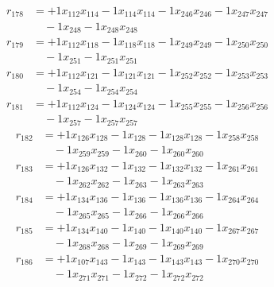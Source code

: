 \[\begin{aligned}
r_{178} &= + 1 x_{112} x_{114} - 1 x_{114} x_{114} - 1 x_{246} x_{246} - 1 x_{247} x_{247} \\
 &\quad - 1 x_{248} - 1 x_{248} x_{248}
\end{aligned}\]
\[\begin{aligned}
r_{179} &= + 1 x_{112} x_{118} - 1 x_{118} x_{118} - 1 x_{249} x_{249} - 1 x_{250} x_{250} \\
 &\quad - 1 x_{251} - 1 x_{251} x_{251}
\end{aligned}\]
\[\begin{aligned}
r_{180} &= + 1 x_{112} x_{121} - 1 x_{121} x_{121} - 1 x_{252} x_{252} - 1 x_{253} x_{253} \\
 &\quad - 1 x_{254} - 1 x_{254} x_{254}
\end{aligned}\]
\[\begin{aligned}
r_{181} &= + 1 x_{112} x_{124} - 1 x_{124} x_{124} - 1 x_{255} x_{255} - 1 x_{256} x_{256} \\
 &\quad - 1 x_{257} - 1 x_{257} x_{257}
\end{aligned}\]
\[\begin{aligned}
r_{182} &= + 1 x_{126} x_{128} - 1 x_{128} - 1 x_{128} x_{128} - 1 x_{258} x_{258} \\
 &\quad - 1 x_{259} x_{259} - 1 x_{260} - 1 x_{260} x_{260}
\end{aligned}\]
\[\begin{aligned}
r_{183} &= + 1 x_{126} x_{132} - 1 x_{132} - 1 x_{132} x_{132} - 1 x_{261} x_{261} \\
 &\quad - 1 x_{262} x_{262} - 1 x_{263} - 1 x_{263} x_{263}
\end{aligned}\]
\[\begin{aligned}
r_{184} &= + 1 x_{134} x_{136} - 1 x_{136} - 1 x_{136} x_{136} - 1 x_{264} x_{264} \\
 &\quad - 1 x_{265} x_{265} - 1 x_{266} - 1 x_{266} x_{266}
\end{aligned}\]
\[\begin{aligned}
r_{185} &= + 1 x_{134} x_{140} - 1 x_{140} - 1 x_{140} x_{140} - 1 x_{267} x_{267} \\
 &\quad - 1 x_{268} x_{268} - 1 x_{269} - 1 x_{269} x_{269}
\end{aligned}\]
\[\begin{aligned}
r_{186} &= + 1 x_{107} x_{143} - 1 x_{143} - 1 x_{143} x_{143} - 1 x_{270} x_{270} \\
 &\quad - 1 x_{271} x_{271} - 1 x_{272} - 1 x_{272} x_{272}
\end{aligned}\]

